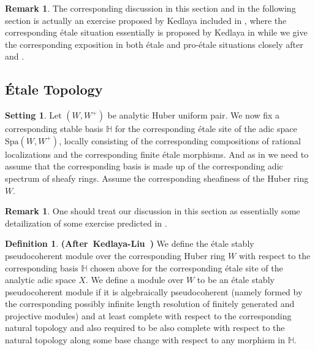 \documentclass[12pt]{amsart}
\theoremstyle{definition}
\newtheorem{definition}[theorem]{Definition}
\newtheorem{remark}[theorem]{Remark}
\numberwithin{equation}{section}
\newtheorem{setting}[theorem]{Setting}
\begin{document}
\begin{remark}
The corresponding discussion in this section and in the following section is actually an exercise proposed by Kedlaya included in \cite{Ked1}, where the corresponding \'etale situation essentially is proposed by Kedlaya in \cite[Discussion after Lemma 1.10.4]{Ked1} while we give the corresponding exposition in both \'etale and pro-\'etale situations closely after \cite{KL1} and \cite{KL2}.	
\end{remark}



\subsection{\'Etale Topology}

\begin{setting}
Let $(W,W^+)$ be analytic Huber uniform pair. We now fix a corresponding stable basis $\mathbb{H}$ for the corresponding \'etale site of the adic space $\mathrm{Spa}(W,W^+)$, locally consisting of the corresponding compositions of rational localizations and the corresponding finite \'etale morphisms. And as in \cite[Hypothesis 1.10.3]{Ked1} we need to assume that the corresponding basis is made up of the corresponding adic spectrum of sheafy rings. Assume the corresponding sheafiness of the Huber ring $W$.
\end{setting}


\begin{remark}
One should treat our discussion in this section as essentially some detailization of some exercise predicted in \cite{Ked1}.	
\end{remark}





\begin{definition} \mbox{\bf{(After Kedlaya-Liu \cite[Definition 2.5.9]{KL2})}}
We define the \'etale stably pseudocoherent module over the corresponding Huber ring $W$ with respect to the corresponding basis $\mathbb{H}$ chosen above for the corresponding \'etale site of the analytic adic space $X$. We define a module over $W$ to be an \'etale stably pseudocoherent module if it is algebraically pseudocoherent (namely formed by the corresponding possibly infinite length resolution of finitely generated and projective modules) and at least complete with respect to the corresponding natural topology and also required to be also complete with respect to the natural topology along some base change with respect to any morphism in $\mathbb{H}$.
\end{definition}
\end{document}
